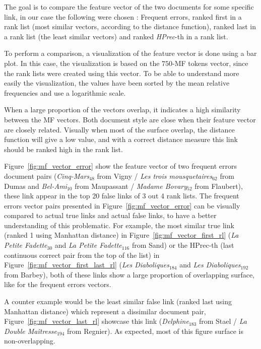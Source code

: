 The goal is to compare the feature vector of the two documents for some specific link, in our case the following were chosen : Frequent errors, ranked first in a rank list (most similar vectors, according to the distance function), ranked last in a rank list (the least similar vectors) and ranked \textit{HPrec}-th in a rank list.

To perform a comparison, a visualization of the feature vector is done using a bar plot.
In this case, the visualization is based on the $750$-MF tokens vector, since the rank lists were created using this vector.
To be able to understand more easily the visualization, the values have been sorted by the mean relative frequencies and use a logarithmic scale.

When a large proportion of the vectors overlap, it indicates a high similarity between the MF vectors.
Both document style are close when their feature vector are closely related.
Visually when most of the surface overlap, the distance function will give a low value, and with a correct distance measure this link should be ranked high in the rank list.

Figure~\ref{fig:mf_vector_error} show the feature vector of two frequent errors document pairs (\textit{Cinq-Mars}$_{48}$ from Vigny / \textit{Les trois mousquetaires}$_{62}$ from Dumas and \textit{Bel-Ami}$_{10}$ from Maupassant / \textit{Madame Bovary}$_{52}$ from Flaubert), these link appear in the top 20 false links of 3 out 4 rank lists.
The frequent errors vector pairs presented in Figure~\ref{fig:mf_vector_error} can be visually compared to actual true links and actual false links, to have a better understanding of this problematic.
For example, the most similar true link (ranked 1 using Manhattan distance) in Figure~\ref{fig:mf_vector_first_rl} (\textit{La Petite Fadette}$_{30}$ and \textit{La Petite Fadette}$_{116}$ from Sand) or the HPrec-th (last continuous correct pair from the top of the list) in Figure~\ref{fig:mf_vector_first_last_rl} (\textit{Les Diaboliques}$_{184}$ and \textit{Les Diaboliques}$_{192}$ from Barbey), both of these links show a large proportion of overlapping surface, like for the frequent errors vectors.

A counter example would be the least similar false link (ranked last using Manhattan distance) which represent a dissimilar document pair, Figure~\ref{fig:mf_vector_last_rl} showcase this link (\textit{Delphine}$_{183}$ from Stael / \textit{La Double Maîtresse}$_{194}$ from Regnier).
As expected, most of this figure surface is non-overlapping.

